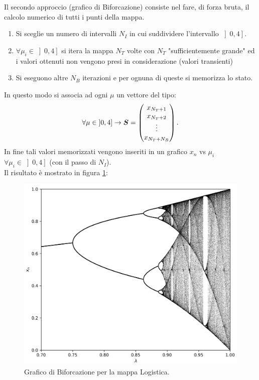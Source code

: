 \noindent
Il secondo approccio (grafico di Biforcazione) consiste nel fare, di forza bruta, il calcolo numerico di tutti i punti della mappa.
\begin{enumerate}
    \item Si sceglie un numero di intervalli $N_I$ in cui suddividere l'intervallo $\left]0, 4\right]$.
\item $\forall \mu_i \in \left]0, 4\right]$ si itera la mappa $N_T$ volte con $N_T$ "sufficientemente grande" ed i valori ottenuti non vengono presi in considerazione (valori transienti)
\item Si eseguono altre $N_B$ iterazioni e per ognuna di queste si memorizza lo stato.
\end{enumerate}
In questo modo si associa ad ogni $\mu$ un vettore del tipo:
\[
    \forall \mu  \in \left]0, 4\right] \to \boldsymbol{S} = \begin{pmatrix} x_{N_T + 1} \\ x_{N_T + 2} \\ \vdots \\ x_{N_T + N_B} \end{pmatrix}
.\] 
In fine tali valori memorizzati vengono inseriti in un grafico $x_n$ vs $\mu_i$ $\forall \mu_i \in \left]0, 4\right]$  (con il passo di $N_I$).\\
Il risultato è mostrato in figura \ref{fig:3_3_3}:
\begin{figure}[H]
    \centering
    \includegraphics[width=\textwidth]{figures/chap3/3_3_3.png}
    \caption{\scriptsize Grafico di Biforcazione per la mappa Logistica.}
    \label{fig:3_3_3}
\end{figure}
